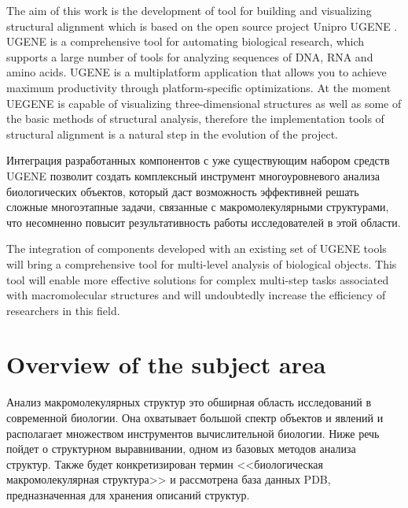 \documentclass[a4paper, 12pt, titlepage, utf8]{extarticle}
\let\oldsection\section         %
\renewcommand{\section}{\newpage\oldsection}
\begin{document}
The aim of this work is the development of tool for building and visualizing
structural alignment which is based on the open source project Unipro UGENE
\cite {ugene}. UGENE is a comprehensive tool for automating biological research,
which supports a large number of tools for analyzing sequences of DNA, RNA and
amino acids. UGENE is a multiplatform application that allows you to achieve
maximum productivity through platform-specific optimizations. At the moment
UEGENE is capable of visualizing three-dimensional structures as well as some
of the basic methods of structural analysis, therefore the implementation tools
of structural alignment is a natural step in the evolution of the project.

\begin{original}
Интеграция разработанных компонентов с уже существующим набором средств UGENE
позволит создать комплексный инструмент многоуровневого анализа биологических
объектов, который даст возможность эффективней решать сложные многоэтапные
задачи, связанные с макромолекулярными структурами, что несомненно повысит
результативность работы исследователей в этой области.
\end{original}

The integration of components developed with an existing set of UGENE tools will
bring a comprehensive tool for multi-level analysis of biological objects. This
tool will enable more effective solutions for complex multi-step tasks
associated with macromolecular structures and will undoubtedly increase the
efficiency of researchers in this field.



\section{Overview of the subject area}	%
\begin{original}
Анализ макромолекулярных структур это обширная область исследований в
современной биологии. Она охватывает большой спектр объектов и явлений и
располагает множеством инструментов вычислительной биологии. Ниже речь пойдет о
структурном выравнивании, одном из базовых методов анализа структур. Также будет
конкретизирован термин <<биологическая макромолекулярная структура>> и
рассмотрена база данных PDB, предназначенная для хранения описаний структур.
\end{original}
\end{document}
